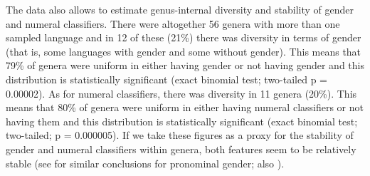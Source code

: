 \documentclass[output=collectionpaper]{langsci/langscibook}
\begin{document}
The data also allows to estimate genus-internal diversity and stability of gender and numeral classifiers. There were altogether 56 genera with more than one sampled language and in 12 of these (21\%) there was diversity in terms of gender (that is, some languages with gender and some without gender). This means that 79\% of genera were uniform in either having gender or not having gender and this distribution is statistically significant (exact binomial test; two-tailed p = 0.00002). As for numeral classifiers, there was diversity in 11 genera (20\%). This means that 80\% of genera were uniform in either having numeral classifiers or not having them and this distribution is statistically significant (exact binomial test; two-tailed; p = 0.000005). If we take these figures as a proxy for the stability of gender and numeral classifiers within genera, both features seem to be relatively stable (see \citealt[433--434]{Bickel2013b} for similar conclusions for pronominal gender; also \citealt[196--202]{Dahl2004}).
\end{document}
